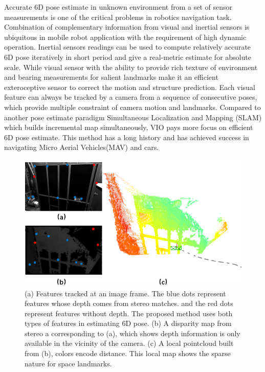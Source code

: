 \documentclass[a4paper, 10pt, conference]{ieeeconf}      %
\begin{document}
Accurate 6D pose estimate in unknown environment from a set of sensor measurements is one of the critical problems in robotics navigation task. Combination of complementary information from visual and inertial sensors is ubiquitous in mobile robot application with the requirement of high dynamic operation. Inertial sensors readings can be used to compute relatively accurate 6D pose iteratively in short period and give a real-metric estimate for absolute scale\cite{weiss2011real}. While visual sensor with the ability to provide rich texture of environment and bearing measurements for salient landmarks make it an efficient exteroceptive sensor to correct the motion and structure prediction. Each visual feature can always be tracked by a camera from a sequence of consecutive poses, which provide multiple constraint of camera motion and landmarks. Compared to another pose estimate paradigm Simultaneous Localization and Mapping (SLAM) which builds incremental map simultaneously, VIO pays more focus on efficient 6D pose estimate. This method has a long history and has achieved success in navigating Micro Aerial Vehicles(MAV) and cars. 
\begin{figure}[thpb]
	\centering
	
	\includegraphics[scale=0.37]{sparse2.jpg}
	
	\caption{(a) Features tracked at an image frame. The blue dots represent
		features whose depth comes from stereo matches. and the red dots represent features without
		depth. The proposed method uses both types of features in estimating 
		6D pose. (b) A disparity map from stereo  a corresponding to (a), which shows depth information is  only available in the vicinity of the camera. (c) A local  pointcloud built from (b),   colors encode distance. This local map shows the sparse nature for space landmarks.  }
	\label{figurelabel}
\end{figure}
\end{document}
